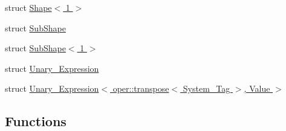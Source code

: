 \begin{DoxyCompactItemize}
\item 
struct \hyperlink{structBC_1_1tensors_1_1exprs_1_1Shape_3_011_01_4}{Shape$<$ 1 $>$}
\item 
struct \hyperlink{classBC_1_1tensors_1_1exprs_1_1SubShape}{Sub\+Shape}
\item 
struct \hyperlink{structBC_1_1tensors_1_1exprs_1_1SubShape_3_011_01_4}{Sub\+Shape$<$ 1 $>$}
\item 
struct \hyperlink{structBC_1_1tensors_1_1exprs_1_1Unary__Expression}{Unary\+\_\+\+Expression}
\item 
struct \hyperlink{structBC_1_1tensors_1_1exprs_1_1Unary__Expression_3_01oper_1_1transpose_3_01System__Tag_01_4_00_01Value_01_4}{Unary\+\_\+\+Expression$<$ oper\+::transpose$<$ System\+\_\+\+Tag $>$, Value $>$}
\end{DoxyCompactItemize}
\subsection*{Functions}
